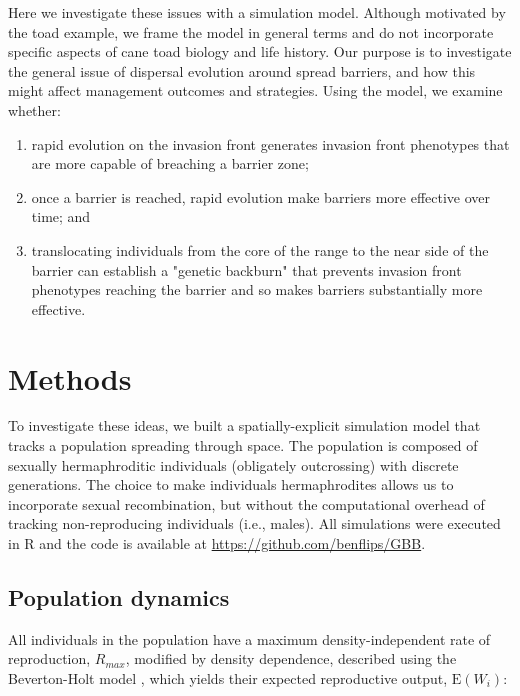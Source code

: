 \documentclass{article}
\begin{document}
Here we investigate these issues with a simulation model.  Although motivated by the toad example, we frame the model in general terms and do not incorporate specific aspects of cane toad biology and life history. Our purpose is to investigate the general issue of dispersal evolution around spread barriers, and how this might affect management outcomes and strategies.  Using the model, we examine whether:
\begin{enumerate}
\item{} rapid evolution on the invasion front generates invasion front phenotypes that are more capable of breaching a barrier zone;
\item{} once a barrier is reached, rapid evolution make barriers more effective over time; and
\item{} translocating individuals from the core of the range to the near side of the barrier can establish a "genetic backburn" that prevents invasion front phenotypes reaching the barrier and so makes barriers substantially more effective.
\end{enumerate}
    
    
    
    
    

\section{Methods}
To investigate these ideas, we built a spatially-explicit simulation model
that tracks a population spreading through space. The population is
composed of sexually hermaphroditic individuals (obligately outcrossing) with discrete
generations. The choice to make individuals hermaphrodites allows us to incorporate sexual recombination, but without the computational overhead of tracking non-reproducing individuals (i.e., males).  All simulations were executed in R \citep{R_Core_Team_2014} and the code is available at \href{https://github.com/benflips/GBB}{https://github.com/benflips/GBB}.

\subsection{Population dynamics}

All individuals in the population have a maximum density-independent
rate of reproduction, \(R_{max}\), modified by density dependence,
described using the Beverton-Holt model \citep{Beverton_1958}, which yields their expected reproductive output, $\text{E}(W_i)$:
\end{document}
